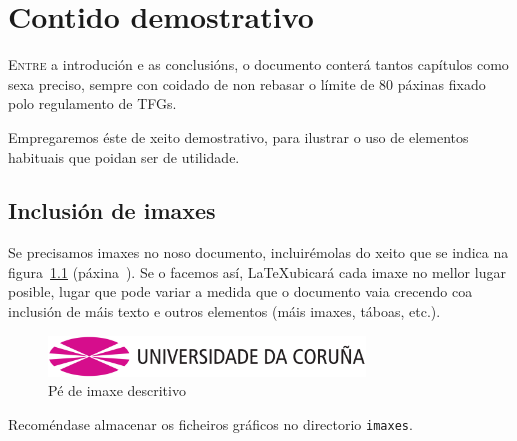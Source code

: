 \chapter{Contido demostrativo}
\label{chap:demo}

\lettrine{E}{ntre} a introdución e as conclusións, o documento conterá
tantos capítulos como sexa preciso, sempre con coidado de non rebasar
o límite de 80 páxinas fixado polo regulamento de TFGs.

Empregaremos éste de xeito demostrativo, para ilustrar o uso de
elementos habituais que poidan ser de utilidade.

\section{Inclusión de imaxes}

Se precisamos imaxes no noso documento, incluirémolas do xeito que se
indica na figura~\ref{fig:exemplo} (páxina~\pageref{fig:exemplo}). Se
o facemos así, \LaTeX ubicará cada imaxe no mellor lugar posible,
lugar que pode variar a medida que o documento vaia crecendo coa
inclusión de máis texto e outros elementos (máis imaxes, táboas,
etc.).

\begin{figure}[hp!]
  \centering
  \includegraphics[width=0.75\textwidth]{imaxes/udc.png}
  \caption{Pé de imaxe descritivo}
  \label{fig:exemplo}
\end{figure}

Recoméndase almacenar os ficheiros gráficos no directorio
\texttt{imaxes}.

